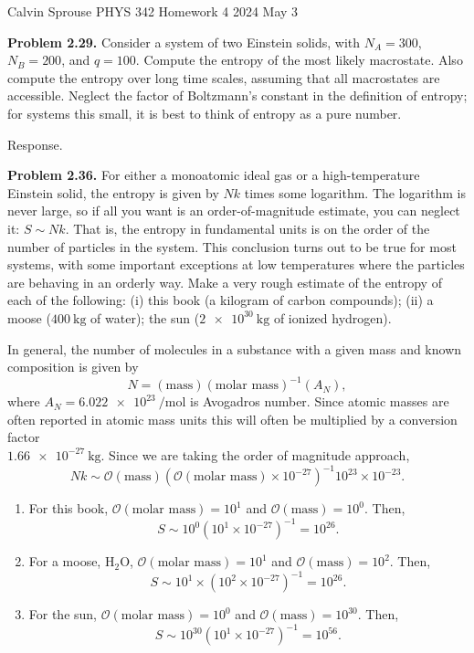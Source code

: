 \documentclass[a4paper, 12pt]{config/homework}
\begin{document}
\noindent
\hfill Calvin Sprouse \hfill PHYS 342 Homework 4 \hfill 2024 May 3 \hfill

\bigskip\noindent
\textbf{Problem 2.29.} Consider a system of two Einstein solids, with \(N_A=300\), \(N_B=200\), and \(q=100\). Compute the entropy of the most likely macrostate. Also compute the entropy over long time scales, assuming that all macrostates are accessible. Neglect the factor of Boltzmann's constant in the definition of entropy; for systems this small, it is best to think of entropy as a pure number.

\noindent
Response.

\pagebreak
\noindent
\textbf{Problem 2.36.} For either a monoatomic ideal gas or a high-temperature Einstein solid, the entropy is given by \(Nk\) times some logarithm. The logarithm is never large, so if all you want is an order-of-magnitude estimate, you can neglect it: \(S \sim Nk\). That is, the entropy in fundamental units is on the order of the number of particles in the system. This conclusion turns out to be true for most systems, with some important exceptions at low temperatures where the particles are behaving in an orderly way. Make a very rough estimate of the entropy of each of the following: (i) this book (a kilogram of carbon compounds); (ii) a moose (\(\qty{400}{\kg}\) of water); the sun (\(\qty{2e30}{\kg}\) of ionized hydrogen).

\noindent
In general, the number of molecules in a substance with a given mass and known composition is given by
\[N = \left(\text{mass}\right)\left(\text{molar mass}\right)^{-1}\left(A_N\right),\]
where \(A_N=\qty{6.022e23}{\per\mol}\) is Avogadros number. Since atomic masses are often reported in atomic mass units this will often be multiplied by a conversion factor \\\(\qty{1.66e-27}{\kg}\). Since we are taking the order of magnitude approach,
\[Nk \sim \mathcal{O}(\text{mass})\left(\mathcal{O}(\text{molar mass})\times 10^{-27}\right)^{-1}10^{23}\times 10^{-23}.\]
\begin{enumerate}[label=(\roman*)]
\item For this book, \(\mathcal{O}(\text{molar mass})=10^1\) and \(\mathcal{O}(\text{mass})=10^0\). Then,
\[S \sim 10^0 \left(10^1 \times 10^{-27}\right)^{-1} = 10^{26}.\]
\item For a moose, \(\text{H}_2\text{O}\), \(\mathcal{O}(\text{molar mass})=10^1\) and \(\mathcal{O}(\text{mass})=10^2\). Then,
\[S \sim 10^1 \times \left(10^2 \times 10^{-27}\right)^{-1} = 10^{26}.\]
\item For the sun, \(\mathcal{O}(\text{molar mass})=10^0\) and \(\mathcal{O}(\text{mass})=10^{30}\). Then,
\[S \sim 10^{30} \left(10^1 \times 10^{-27}\right)^{-1} = 10^{56}.\]
\end{enumerate}
\end{document}
